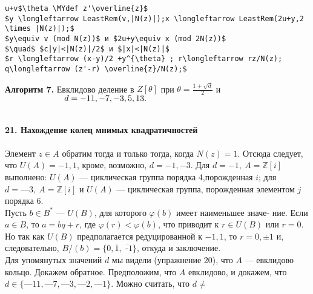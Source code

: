 \documentclass{mai_book}
\begin{document}
\begin{lstlisting}[mathescape=true]
u+v$\theta \MYdef z'\overline{z}$
$y \longleftarrow LeastRem(v,|N(z)|);x \longleftarrow LeastRem(2u+y,2 \times |N(z)|);$
$y\equiv v (mod N(z))$ и $2u+y\equiv x (mod 2N(z))$
$\quad$ $c|y|<|N(z)|/2$ и $|x|<|N(z)|$
$r \longleftarrow (x-y)/2 +y^{\theta} ; r\longleftarrow rz/N(z); q\longleftarrow (z'-r) \overline{z}/N(z);$
\end{lstlisting}
\begin{center}
\parbox{10cm}{
{\bf Алгоритм 7.} Евклидово деление в $Z[\theta]$ при $\theta = \frac{1+\sqrt{d}}2$ и 
 $\hspace*{70pt} d = -11, -7, -3, 5, 13.$}
\end{center}
\ \\
\noindent\textbf{21. Нахождение колец мнимых квадратичностей}\\
\\
\hspace*{15pt}{\bf a.} Элемент $z\in A$ обратим тогда и только тогда, когда $N(z)=1$.\linebreak
Отсюда следует, что $U(A)={-1,1}$, кроме, возможно, $d=-1,-3$. Для\linebreak
$d=-1,~A=\mathbb{Z}[i]$ выполнено: $U(A)$ — циклическая группа порядка 4,\linebreak порожденная $i$; для $d=—3,~A=\mathbb{Z}[i]$ и $U(A)$ — циклическая группа,\linebreak 
порожденная элементом $j$ порядка 6.\newline
\\
\hspace*{15pt}{\bf b.} Пусть $b\in B^{\ast}$ — $U(B)$, для которого $\varphi(b)$ имеет наименьшее значе-\linebreak
ние. Если $a\in B$, то $a = bq + r$, где $\varphi(r)<\varphi(b)$, что приводит к $r\in U(B)$\linebreak
или $r=0$. Но так как $U(B)$ предполагается редуцированной к ${-1,1}$,\linebreak 
то $r=0,\pm1$ и, следовательно, $B/(b)=\{\overline{\mbox{0}},\overline{\mbox{1}},\overline{\mbox{ -1}}\}$, откуда и заключение.\newline
\\
\hspace*{15pt}{\bf c.} Для упомянутых значений $d$ мы видели (упражнение 20), что $A$ —\linebreak
евклидово кольцо. Докажем обратное. Предположим, что $A$ евклидово, и докажем, что $d\in\{ —11, —7, —3, —2, —1\}$. Можно считать, что $d\neq$\linebreak
\end{document}
